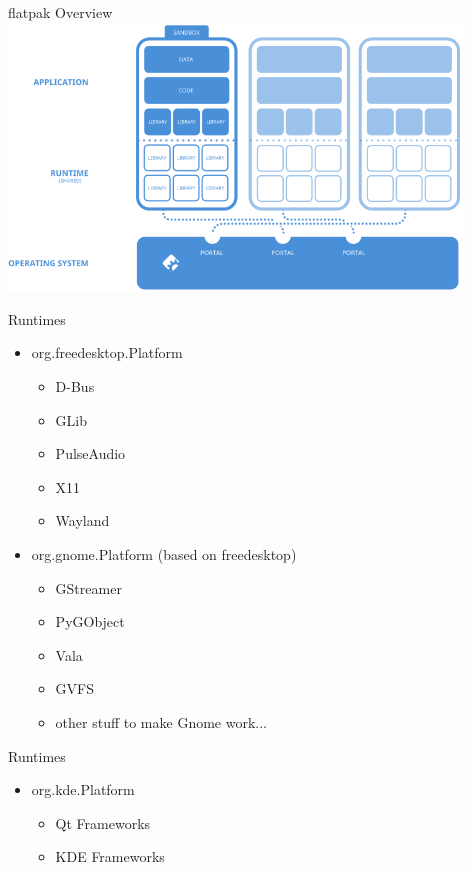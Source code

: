 \documentclass{lug}
\begin{document}
\begin{frame}{flatpak Overview}
    \center
    \includegraphics[width=0.9\textwidth]{./graphics/flatpak_overview.png}
\end{frame}

\begin{frame}{Runtimes}
    \begin{itemize}
        \item org.freedesktop.Platform
            \begin{itemize}
                \item D-Bus
                \item GLib
                \item PulseAudio
                \item X11
                \item Wayland
            \end{itemize}
        \item org.gnome.Platform (based on freedesktop)
            \begin{itemize}
                \item GStreamer
                \item PyGObject
                \item Vala
                \item GVFS
                \item other stuff to make Gnome work...
            \end{itemize}
    \end{itemize}
\end{frame}

\begin{frame}{Runtimes}
    \begin{itemize}
        \item org.kde.Platform
            \begin{itemize}
                \item Qt Frameworks
                \item KDE Frameworks
            \end{itemize}
    \end{itemize}
\end{frame}
\end{document}
